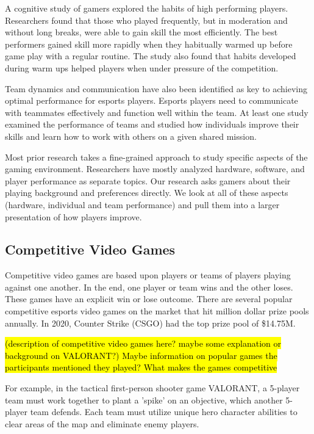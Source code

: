 \documentclass[11pt,manuscript,screen,review]{acmart} %
\begin{document}
A cognitive study of gamers explored the habits of high performing players. Researchers found that those who played frequently, but in moderation and without long breaks, were able to gain skill the most efficiently. The best performers gained skill more rapidly when they habitually warmed up before game play with a regular routine. The study also found that habits developed during warm ups helped players when under pressure of the competition. \cite{huang2017}

Team dynamics and communication have also been identified as key to achieving optimal performance for esports players. Esports players need to communicate with teammates effectively and function well within the team. \cite{himmel2017} At least one study examined the performance of teams and studied how individuals improve their skills and learn how to work with others on a given shared mission. \cite{Sapienza2018}

Most prior research takes a fine-grained approach to study specific aspects of the gaming environment. Researchers have mostly analyzed hardware, software, and player performance as separate topics. Our research asks gamers about their playing background and preferences directly. We look at all of these aspects (hardware, individual and team performance) and pull them into a larger presentation of how players improve.

\subsection{Competitive Video Games}
Competitive video games are based upon players or teams of players playing against one another. In the end, one player or team wins and the other loses. These games have an explicit win or lose outcome. There are several popular competitive esports video games on the market that hit million dollar prize pools annually. In 2020, Counter Strike (CSGO) had the top prize pool of \$14.75M. \cite{murray2021} 

\hl{(description of competitive video games here? maybe some explanation or background on VALORANT?) Maybe information on popular games the participants mentioned they played? What makes the games competitive}

 For example, in the tactical first-person shooter game VALORANT, a 5-player team must work together to plant a 'spike' on an objective, which another 5-player team defends. Each team must utilize unique hero character abilities to clear areas of the map and eliminate enemy players. 
\end{document}
